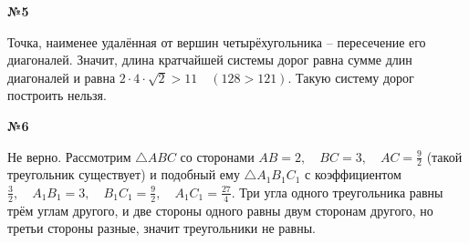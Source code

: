 \documentclass{article}
\newenvironment{task}{\begin{center}\fontsize{14}{14}\selectfont\bf}{\rm\fontsize{12}{12}\selectfont\end{center}}
\begin{document}
	\begin{task} 
		№5
	\end{task}
	Точка, наименее удалённая от вершин четырёхугольника -- пересечение его диагоналей. Значит, длина кратчайшей системы дорог равна сумме длин диагоналей и равна $2\cdot4\cdot\sqrt{2} > 11 \quad (128 > 121)$. Такую систему дорог построить нельзя. 
	
	
	
	\begin{task} 
		№6
	\end{task}
	Не верно. Рассмотрим $\triangle ABC$ со сторонами $ AB = 2, \quad BC = 3, \quad AC = \frac{9}{2}$ (такой треугольник существует) и подобный ему $\triangle A_1B_1C_1$ с коэффициентом $\frac{3}{2}, \quad A_1B_1 = 3, \quad B_1C_1 = \frac{9}{2}, \quad A_1C_1 = \frac{27}{4}$. Три угла одного треугольника равны трём углам другого, и две стороны одного равны двум сторонам другого, но третьи стороны разные, значит треугольники не равны. 
	
	
	
	
\end{document}
